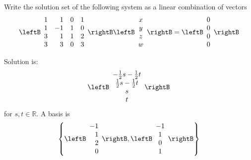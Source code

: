 \begin{enumialphparenastyle}
\begin{ex} \label{exerlineartransf8}Write the solution set of the following system as a linear combination of vectors
\begin{equation*}
\leftB
\begin{array}{rrrr}
1 & 1 & 0 & 1 \\
1 & -1 & 1 & 0 \\
3 & 1 & 1 & 2 \\
3 & 3 & 0 & 3
\end{array}
\rightB \leftB
\begin{array}{c}
x \\
y \\
z \\
w
\end{array}
\rightB =\leftB
\begin{array}{r}
0 \\
0 \\
0 \\
0
\end{array}
\rightB 
\end{equation*}
\begin{sol}
Solution is:
\[
\leftB
\begin{array}{c}
-\frac{1}{2}s-\frac{1}{2}t \\
\frac{1}{2}s-\frac{1}{2}t \\
s \\
t
\end{array}
\rightB
\]
for $s,t\in \mathbb{R}$. A basis is
\[
\left\{ \leftB
\begin{array}{r}
-1 \\
1 \\
2 \\
0
\end{array}
\rightB ,\leftB
\begin{array}{c}
-1 \\
1 \\
0 \\
1
\end{array}
\rightB \right\}
\]
\end{sol}
\end{ex}


\end{enumialphparenastyle}
